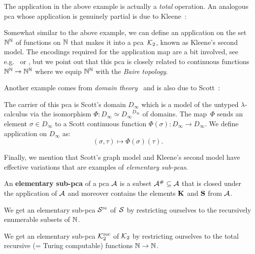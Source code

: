 The application in the above example is actually a \emph{total} operation. An
analogous pca whose application is genuinely partial is due to
Kleene~\cite{KleeneVesley1965}:
\begin{example}\label{Kleene-2}
  Somewhat similar to the above example, we can define an application on the set
  \(\Nat^\Nat\) of functions on \(\Nat\) that makes it into a pca~\(\Ktwo\),
  known as Kleene's second model.
  The encodings required for the application map are a bit involved, see
  e.g.~\cite[p.~30 and Section~2.1.2]{Bauer2023} or
  \cite[Section~1.4.3]{vanOosten2008}, but we point out that this pca is closely
  related to continuous functions \(\Nat^\Nat \to \Nat^\Nat\) where we equip
  \(\Nat^\Nat\) with the \emph{Baire topology}.
\end{example}

Another example comes from \emph{domain theory}~\cite{AmadioCurien1998} and is
also due to Scott~\cite{Scott1972}:
\begin{example}
  The carrier of this pca is Scott's domain \(D_\infty\) which is a model of the
  untyped \(\lambda\)-calculus via the isomorphism
  \(\Phi \colon D_\infty \simeq {D_\infty}^{D_\infty}\) of domains.
  The map~\(\Phi\) sends an element \(\sigma \in D_\infty\) to a Scott
  continuous function \(\Phi(\sigma) \colon D_\infty \to D_\infty\).
  We define application on \(D_\infty\) as:
  \[
    (\sigma,\tau) \mapsto \Phi(\sigma)(\tau).
  \]
\end{example}

Finally, we mention that Scott's graph model and Kleene's second model have
effective variations that are examples of \emph{elementary sub-pcas}.

\begin{definition}
  An \textbf{elementary sub-pca} of a pca \(\AA\) is a subset
  \(\AA^\# \subseteq \AA\) that is closed under the application of \(\AA\) and
  moreover contains the elements \(\kcomb\) and \(\scomb\) from \(\AA\).
\end{definition}

\begin{example}
  We get an elementary sub-pca \(\Scottre\) of~\(\Scott\) by restricting
  ourselves to the recursively enumerable subsets of \(\Nat\).
\end{example}

\begin{example}\label{Kleene-rec-2}
  We get an elementary sub-pca \(\Ktworec\) of \(\Ktwo\) by restricting
  ourselves to the total recursive (= Turing computable) functions
  \(\Nat \to \Nat\).
\end{example}

